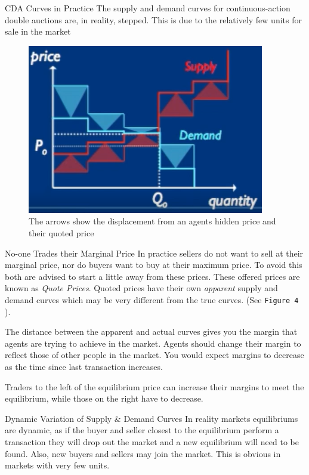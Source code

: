 \documentclass[11pt,a4paper]{article}
\begin{document}
  \begin{remark}{CDA Curves in Practice}
    The supply and demand curves for continuous-action double auctions are, in reality, stepped. This is due to the relatively few units for sale in the market
  \end{remark}

  \begin{figure}[ht!]
    \centering
    \includegraphics[width=.3\textwidth]{quotedPrices.PNG}
    \caption{The arrows show the displacement from an agents hidden price and their quoted price}
  \end{figure}

  \begin{proposition}{No-one Trades their Marginal Price}
    In practice sellers do not want to sell at their marginal price, nor do buyers want to buy at their maximum price. To avoid this both are advised to start a little away from these prices. These offered prices are known as \textit{Quote Prices}. Quoted prices have their own \textit{apparent} supply and demand curves which may be very different from the true curves. (See \texttt{Figure 4} ).
    \par The distance between the apparent and actual curves gives you the margin that agents are trying to achieve in the market. Agents should change their margin to reflect those of other people in the market. You would expect margins to decrease as the time since last transaction increases.
    \par Traders to the left of the equilibrium price can increase their margins to meet the equilibrium, while those on the right have to decrease.
  \end{proposition}

  \begin{proposition}{Dynamic Variation of Supply \& Demand Curves}
    In reality markets equilibriums are dynamic, as if the buyer and seller closest to the equilibrium perform a transaction they will drop out the market and a new equilibrium will need to be found. Also, new buyers and sellers may join the market. This is obvious in markets with very few units.
  \end{proposition}
\end{document}
